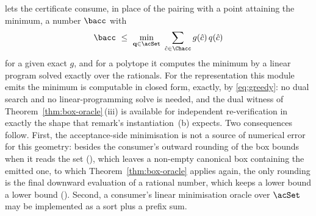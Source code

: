 
\begin{remark}\label{rem:box-oracle-consumer}
 lets the certificate consume, in
place of the pairing with a point attaining the minimum, a number $\bacc$
with
\begin{equation}\label{eq:bacc-shape}
  \bacc\ \le\ \min_{\mathbf{q}\in\acSet}\ \sum_{\hat c\in\Chacc}g(\hat c)\,
  q(\hat c)
\end{equation}
for a given exact $g$, and for a polytope it computes the minimum by a
linear program solved exactly over the rationals. For the representation
this module emits the minimum is computable in closed form, exactly, by
\eqref{eq:greedy}: no dual search and no linear-programming solve is needed,
and the dual witness of Theorem~\ref{thm:box-oracle}\,(iii) is available for
independent re-verification in exactly the shape that remark's
instantiation~(b) expects. Two consequences follow. First, the acceptance-side
minimisation is not a source of numerical error for this geometry: besides the
consumer's outward rounding of the box bounds when it reads the set
(), which leaves a non-empty
canonical box containing the emitted one, to which
Theorem~\ref{thm:box-oracle} applies again, the only rounding is the final
downward evaluation of a rational number, which keeps a lower bound a lower
bound (). Second,
a consumer's linear minimisation oracle over $\acSet$ may be implemented as a
sort plus a prefix sum.
\end{remark}
